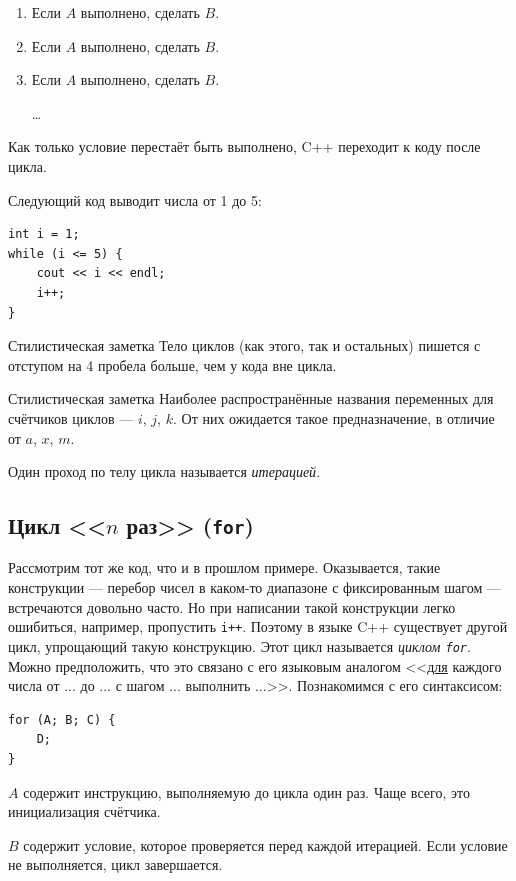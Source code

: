 \documentclass{article}
\newcommand{\style}[1]{
	\begin{sectionenv}[green!30!white]{Стилистическая заметка}
		#1
	\end{sectionenv}
}
\begin{document}
	\begin{enumerate}
		\item{Если $A$ выполнено, сделать $B$.}
		\item{Если $A$ выполнено, сделать $B$.}
		\item{Если $A$ выполнено, сделать $B$.}
		
		\dots
	\end{enumerate}
	
	Как только условие перестаёт быть выполнено, C++ переходит к коду после цикла.
	
	Следующий код выводит числа от 1 до 5:
	
	\begin{lstlisting}
int i = 1;
while (i <= 5) {
	cout << i << endl;
	i++;
}
	\end{lstlisting}
	
	\style{Тело циклов (как этого, так и остальных) пишется с отступом на 4 пробела больше, чем у кода вне цикла.}
	
	\style{Наиболее распространённые названия переменных для счётчиков циклов --- $i$, $j$, $k$. От них ожидается такое предназначение, в отличие от $a$, $x$, $m$.}
	
	Один проход по телу цикла называется \textit{итерацией}.
	
	\subsection{Цикл <<$n$ раз>> (\texttt{for})}
	
	Рассмотрим тот же код, что и в прошлом примере. Оказывается, такие конструкции --- перебор чисел в каком-то диапазоне с фиксированным шагом --- встречаются довольно часто. Но при написании такой конструкции легко ошибиться, например, пропустить \texttt{i++}. Поэтому в языке C++ существует другой цикл, упрощающий такую конструкцию. Этот цикл называется \textit{циклом \texttt{for}}. Можно предположить, что это связано с его языковым аналогом <<\underline{для} каждого числа от ... до ... с шагом ... выполнить ...>>. Познакомимся с его синтаксисом:
	
	\begin{lstlisting}
for (A; B; C) {
	D;
}
	\end{lstlisting}
	
	$A$ содержит инструкцию, выполняемую до цикла один раз. Чаще всего, это инициализация счётчика.
	
	$B$ содержит условие, которое проверяется перед каждой итерацией. Если условие не выполняется, цикл завершается.
	
\end{document}

